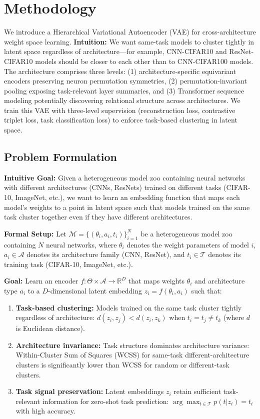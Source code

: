 \section{Methodology}

We introduce a Hierarchical Variational Autoencoder (VAE) for cross-architecture weight space learning. \textbf{Intuition:} We want same-task models to cluster tightly in latent space regardless of architecture---for example, CNN-CIFAR10 and ResNet-CIFAR10 models should be closer to each other than to CNN-CIFAR100 models. The architecture comprises three levels: (1) architecture-specific equivariant encoders preserving neuron permutation symmetries, (2) permutation-invariant pooling exposing task-relevant layer summaries, and (3) Transformer sequence modeling potentially discovering relational structure across architectures. We train this VAE with three-level supervision (reconstruction loss, contrastive triplet loss, task classification loss) to enforce task-based clustering in latent space.

\subsection{Problem Formulation}

\textbf{Intuitive Goal:} Given a heterogeneous model zoo containing neural networks with different architectures (CNNs, ResNets) trained on different tasks (CIFAR-10, ImageNet, etc.), we want to learn an embedding function that maps each model's weights to a point in latent space such that models trained on the same task cluster together even if they have different architectures.

\textbf{Formal Setup:} Let $\mathcal{M} = \{(\theta_i, a_i, t_i)\}_{i=1}^N$ be a heterogeneous model zoo containing $N$ neural networks, where $\theta_i$ denotes the weight parameters of model $i$, $a_i \in \mathcal{A}$ denotes its architecture family (CNN, ResNet), and $t_i \in \mathcal{T}$ denotes its training task (CIFAR-10, ImageNet, etc.).

\textbf{Goal:} Learn an encoder $f: \Theta \times \mathcal{A} \rightarrow \mathbb{R}^D$ that maps weights $\theta_i$ and architecture type $a_i$ to a $D$-dimensional latent embedding $z_i = f(\theta_i, a_i)$ such that:

\begin{enumerate}
\item \textbf{Task-based clustering:} Models trained on the same task cluster tightly regardless of architecture: $d(z_i, z_j) < d(z_i, z_k)$ when $t_i = t_j \neq t_k$ (where $d$ is Euclidean distance).

\item \textbf{Architecture invariance:} Task structure dominates architecture variance: Within-Cluster Sum of Squares (WCSS) for same-task different-architecture clusters is significantly lower than WCSS for random or different-task clusters.

\item \textbf{Task signal preservation:} Latent embeddings $z_i$ retain sufficient task-relevant information for zero-shot task prediction: $\arg\max_{t \in \mathcal{T}} p(t | z_i) = t_i$ with high accuracy.
\end{enumerate}

